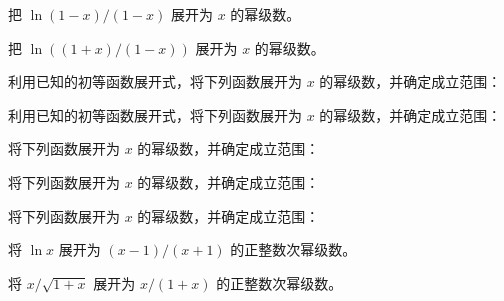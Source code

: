 \newpage
\noindent\begin{minipage}{\textwidth}
把 $\ln(1-x)/(1-x)$ 展开为 $x$ 的幂级数。
\end{minipage}\par\vfill
\noindent\begin{minipage}{\textwidth}
把 $\ln((1+x)/(1-x))$ 展开为 $x$ 的幂级数。
\end{minipage}\par\vfill
\noindent\begin{minipage}{\textwidth}
利用已知的初等函数展开式，将下列函数展开为 $x$ 的幂级数，并确定成立范围：
\end{minipage}\par\vfill
\newpage
\noindent\begin{minipage}{\textwidth}
利用已知的初等函数展开式，将下列函数展开为 $x$ 的幂级数，并确定成立范围：
\end{minipage}\par\vfill
\noindent\begin{minipage}{\textwidth}
将下列函数展开为 $x$ 的幂级数，并确定成立范围：
\end{minipage}\par\vfill
\noindent\begin{minipage}{\textwidth}
将下列函数展开为 $x$ 的幂级数，并确定成立范围：
\end{minipage}\par\vfill
\newpage
\noindent\begin{minipage}{\textwidth}
将下列函数展开为 $x$ 的幂级数，并确定成立范围：
\end{minipage}\par\vfill
\noindent\begin{minipage}{\textwidth}
将 $\ln x$ 展开为 $(x-1)/(x+1)$ 的正整数次幂级数。
\end{minipage}\par\vfill
\noindent\begin{minipage}{\textwidth}
将 $x/\sqrt{1+x}$ 展开为 $x/(1+x)$ 的正整数次幂级数。
\end{minipage}\par\vfill
